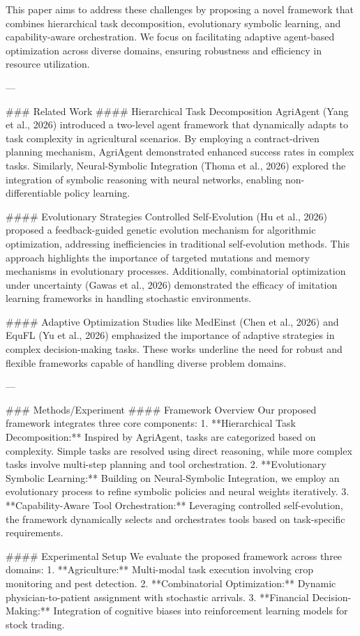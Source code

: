 This paper aims to address these challenges by proposing a novel framework that combines hierarchical task decomposition, evolutionary symbolic learning, and capability-aware orchestration. We focus on facilitating adaptive agent-based optimization across diverse domains, ensuring robustness and efficiency in resource utilization.

---

### Related Work
#### Hierarchical Task Decomposition
AgriAgent (Yang et al., 2026) introduced a two-level agent framework that dynamically adapts to task complexity in agricultural scenarios. By employing a contract-driven planning mechanism, AgriAgent demonstrated enhanced success rates in complex tasks. Similarly, Neural-Symbolic Integration (Thoma et al., 2026) explored the integration of symbolic reasoning with neural networks, enabling non-differentiable policy learning.

#### Evolutionary Strategies
Controlled Self-Evolution (Hu et al., 2026) proposed a feedback-guided genetic evolution mechanism for algorithmic optimization, addressing inefficiencies in traditional self-evolution methods. This approach highlights the importance of targeted mutations and memory mechanisms in evolutionary processes. Additionally, combinatorial optimization under uncertainty (Gawas et al., 2026) demonstrated the efficacy of imitation learning frameworks in handling stochastic environments.

#### Adaptive Optimization
Studies like MedEinst (Chen et al., 2026) and EquFL (Yu et al., 2026) emphasized the importance of adaptive strategies in complex decision-making tasks. These works underline the need for robust and flexible frameworks capable of handling diverse problem domains.

---

### Methods/Experiment
#### Framework Overview
Our proposed framework integrates three core components:
1. **Hierarchical Task Decomposition:** Inspired by AgriAgent, tasks are categorized based on complexity. Simple tasks are resolved using direct reasoning, while more complex tasks involve multi-step planning and tool orchestration.
2. **Evolutionary Symbolic Learning:** Building on Neural-Symbolic Integration, we employ an evolutionary process to refine symbolic policies and neural weights iteratively.
3. **Capability-Aware Tool Orchestration:** Leveraging controlled self-evolution, the framework dynamically selects and orchestrates tools based on task-specific requirements.

#### Experimental Setup
We evaluate the proposed framework across three domains:
1. **Agriculture:** Multi-modal task execution involving crop monitoring and pest detection.
2. **Combinatorial Optimization:** Dynamic physician-to-patient assignment with stochastic arrivals.
3. **Financial Decision-Making:** Integration of cognitive biases into reinforcement learning models for stock trading.

